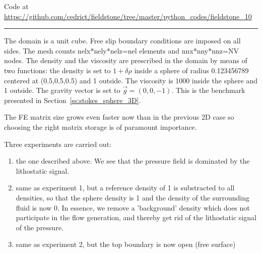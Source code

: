

\begin{center}
Code at \url{https://github.com/cedrict/fieldstone/tree/master/python_codes/fieldstone_10}
\end{center}

\par\noindent\rule{\textwidth}{0.4pt}

The domain is a unit cube. Free slip boundary conditions 
are imposed on all sides. The mesh counts 
nelx*nely*nelz=nel elements and 
nnx*nny*nnz=NV nodes.
The density and the viscosity are prescribed in the domain 
by means of two functions:
the density is set to $1+\delta \rho$ inside a sphere of radius 0.123456789 centered 
at (0.5,0.5,0.5) and 1 outside. The viscosity is 1000 inside the sphere
and 1 outside.  The gravity vector is set to $\vec{g}=(0,0,-1)$.
This is the benchmark presented in Section~\ref{ss:stokes_sphere_3D}.

The FE matrix size grows even faster now than in the previous 2D case so
choosing the right matrix storage is of paramount importance. 

Three experiments are carried out:
\begin{enumerate}
\item the one described above.
We see that the pressure field is dominated by the lithostatic signal.
\item same as experiment 1, but a reference density of 1 is substracted to all densities, so that 
the sphere density is 1 and the density of the surrounding fluid is now 0. In essence, we remove a
'background' density which does not participate in the flow generation, and thereby get rid of the 
lithostatic signal of the pressure.
\item same as experiment 2, but the top boundary is now open (free surface)
\end{enumerate} 


